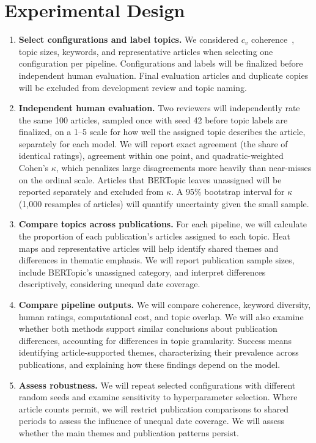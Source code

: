 \documentclass[conference]{IEEEtran}
\begin{document}
\section*{Experimental Design}
\begin{enumerate}
    \item \textbf{Select configurations and label topics.} We considered $c_v$ coherence~\cite{roder2015coherence}, topic sizes, keywords, and representative articles when selecting one configuration per pipeline. Configurations and labels will be finalized before independent human evaluation. Final evaluation articles and duplicate copies will be excluded from development review and topic naming.
    \item \textbf{Independent human evaluation.} Two reviewers will independently rate the same 100 articles, sampled once with seed 42 before topic labels are finalized, on a 1--5 scale for how well the assigned topic describes the article, separately for each model. We will report exact agreement (the share of identical ratings), agreement within one point, and quadratic-weighted Cohen's $\kappa$, which penalizes large disagreements more heavily than near-misses on the ordinal scale. Articles that BERTopic leaves unassigned will be reported separately and excluded from $\kappa$. A 95\% bootstrap interval for $\kappa$ (1,000 resamples of articles) will quantify uncertainty given the small sample.
    \item \textbf{Compare topics across publications.} For each pipeline, we will calculate the proportion of each publication's articles assigned to each topic. Heat maps and representative articles will help identify shared themes and differences in thematic emphasis. We will report publication sample sizes, include BERTopic's unassigned category, and interpret differences descriptively, considering unequal date coverage.
    \item \textbf{Compare pipeline outputs.} We will compare coherence, keyword diversity, human ratings, computational cost, and topic overlap. We will also examine whether both methods support similar conclusions about publication differences, accounting for differences in topic granularity. Success means identifying article-supported themes, characterizing their prevalence across publications, and explaining how these findings depend on the model.
    \item \textbf{Assess robustness.} We will repeat selected configurations with different random seeds and examine sensitivity to hyperparameter selection. Where article counts permit, we will restrict publication comparisons to shared periods to assess the influence of unequal date coverage. We will assess whether the main themes and publication patterns persist.
\end{enumerate}
\end{document}
